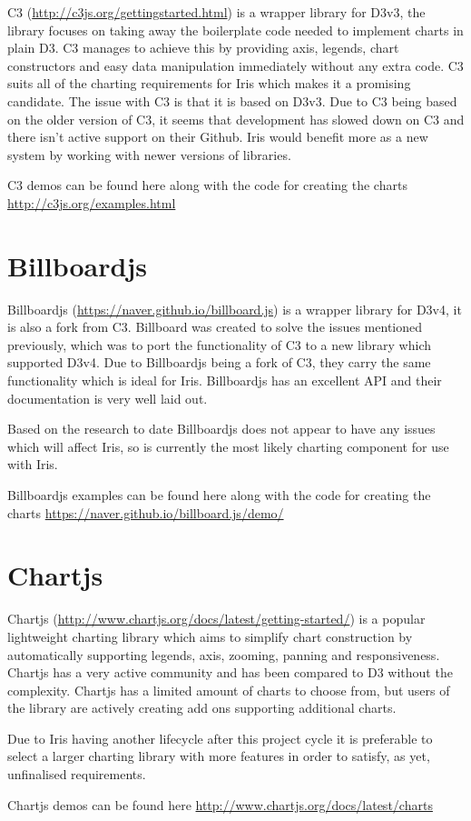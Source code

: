 \documentclass[12pt,a4paper,titlepage]{report}
\begin{document}
\begin{appendices}
C3 (\url{http://c3js.org/gettingstarted.html}) is a wrapper library for D3v3, the library focuses on taking away the boilerplate code needed to implement charts in plain D3. C3 manages to achieve this by providing axis, legends, chart constructors and easy data manipulation immediately without any extra code. C3 suits all of the charting requirements for Iris which makes it a promising candidate. The issue with C3 is that it is based on D3v3. Due to C3 being based on the older version of C3, it seems that development has slowed down on C3 and there isn’t active support on their Github. Iris would benefit more as a new system by working with newer versions of libraries.

C3 demos can be found here along with the code for creating the charts \url{http://c3js.org/examples.html}


\section{Billboardjs}

Billboardjs (\url{https://naver.github.io/billboard.js}) is a wrapper library for D3v4, it is also a fork from C3. Billboard was created to solve the issues mentioned previously, which was to port the functionality of C3 to a new library which supported D3v4. Due to Billboardjs being a fork of C3, they carry the same functionality which is ideal for Iris. Billboardjs has an excellent API and their documentation is very well laid out. 

Based on the research to date Billboardjs does not appear to have any issues which will affect Iris, so is currently the most likely charting component for use with Iris.

Billboardjs examples can be found here along with the code for creating the charts \url{https://naver.github.io/billboard.js/demo/}

\section{Chartjs}

Chartjs (\url{http://www.chartjs.org/docs/latest/getting-started/}) is a popular lightweight charting library which aims to simplify chart construction by automatically supporting legends, axis, zooming, panning and responsiveness. Chartjs has a very active community and has been compared to D3 without the complexity. Chartjs has a limited amount of charts to choose from, but users of the library are actively creating add ons supporting additional charts. 

Due to Iris having another lifecycle after this project cycle it is preferable to select a larger charting library with more features in order to satisfy, as yet, unfinalised  requirements.

Chartjs demos can be found here \url{http://www.chartjs.org/docs/latest/charts}
\end{appendices}
\end{document}

